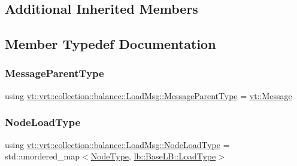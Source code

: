 \subsection*{Additional Inherited Members}


\subsection{Member Typedef Documentation}
\mbox{\label{structvt_1_1vrt_1_1collection_1_1balance_1_1_load_msg_a922095d2c2ceb7f192523defa012ca6d}} 
\subsubsection{\texorpdfstring{Message\+Parent\+Type}{MessageParentType}}
{\footnotesize\ttfamily using \hyperlink{structvt_1_1vrt_1_1collection_1_1balance_1_1_load_msg_a922095d2c2ceb7f192523defa012ca6d}{vt\+::vrt\+::collection\+::balance\+::\+Load\+Msg\+::\+Message\+Parent\+Type} =  \hyperlink{namespacevt_a3a3ddfef40b4c90915fa43cdd5f129ea}{vt\+::\+Message}}

\mbox{\label{structvt_1_1vrt_1_1collection_1_1balance_1_1_load_msg_a65e300c2d6119d11e9121b17f7f94850}} 
\subsubsection{\texorpdfstring{Node\+Load\+Type}{NodeLoadType}}
{\footnotesize\ttfamily using \hyperlink{structvt_1_1vrt_1_1collection_1_1balance_1_1_load_msg_a65e300c2d6119d11e9121b17f7f94850}{vt\+::vrt\+::collection\+::balance\+::\+Load\+Msg\+::\+Node\+Load\+Type} =  std\+::unordered\+\_\+map$<$\hyperlink{namespacevt_a866da9d0efc19c0a1ce79e9e492f47e2}{Node\+Type}, \hyperlink{structvt_1_1vrt_1_1collection_1_1lb_1_1_base_l_b_a215e22b9f12678303f49615ae3be05cc}{lb\+::\+Base\+L\+B\+::\+Load\+Type}$>$}



